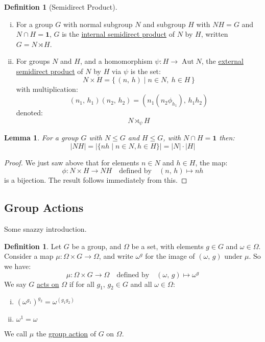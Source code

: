 \documentclass[a4paper, oneside, 12pt, final]{article}
\renewcommand{\emph}{\underline}
\newtheorem{lemma}[theorem]{Lemma}
\theoremstyle{definition}
\newtheorem{definition}[theorem]{Definition}
\DeclareMathOperator{\Aut}{Aut}
\begin{document}
\begin{definition}[Semidirect Product]
\mbox{}
\begin{enumerate}[(i)]
    \item

        For a group \(G\) with normal subgroup \(N\) and subgroup \(H\) with \(NH = G\) and \(N \cap H = \bm{1}\),
        \(G\) is the \emph{internal semidirect product} of \(N\) by \(H\), written \(G = N \rtimes H\).

    \item

        For groups \(N\) and \(H\), and a homomorphism \(\psi:H \to \Aut{N}\), the \emph{external semidirect product} of
        \(N\) by \(H\) via \(\psi\) is the set:
        \[N \times H = \{\,(n,\,h) \mid n \in N,\ h \in H\,\}\]
        with multiplication:
        \[(n_1,\,h_1)(n_2,\,h_2) = (n_1(n_2\phi_{h_1}),\,h_1 h_2)\]
        denoted:
        \[N \rtimes_{\psi} H\]

\end{enumerate}
\end{definition}

\begin{lemma}\label{lem:setprodorder}
    For a group \(G\) with \(N \leqslant G\) and \(H \leqslant G\), with \(N \cap H = \bm{1}\) then:
    \[|NH| = |\{nh \mid n \in N, h \in H\}| = |N| \cdot |H|\]
\end{lemma}

\begin{proof}
    We just saw above that for elements \(n \in N\) and \(h \in H\), the map:
    \[\phi:N \times H \to NH \quad \text{defined by} \quad (n,\,h) \mapsto nh\]
    is a bijection.
    The result follows immediately from this.
\end{proof}

\subsection{Group Actions}
Some snazzy introduction.

\begin{definition}
    Let \(G\) be a group, and \(\Omega\) be a set, with elements \(g \in G\) and \(\omega \in \Omega\).
    Consider a map \(\mu:\Omega \times G \to \Omega\), and write \(\omega^g\) for the image of \((\omega,\,g)\) under
    \(\mu\).
    So we have:
    \[\mu:\Omega \times G \to \Omega \quad \text{defined by} \quad (\omega,\,g) \mapsto \omega^g\]
    We say \(G\) \emph{acts on} \(\Omega\) if for all \(g_1,\,g_2 \in G\) and all \(\omega \in \Omega\):
    \begin{enumerate}[(i)]
        \item \({(\omega^{g_1})}^{g_2} = \omega^{(g_1 g_2)}\)
        \item \(\omega^1 = \omega\)
    \end{enumerate}
    We call \(\mu\) the \emph{group action} of \(G\) on \(\Omega\).
\end{definition}
\end{document}
